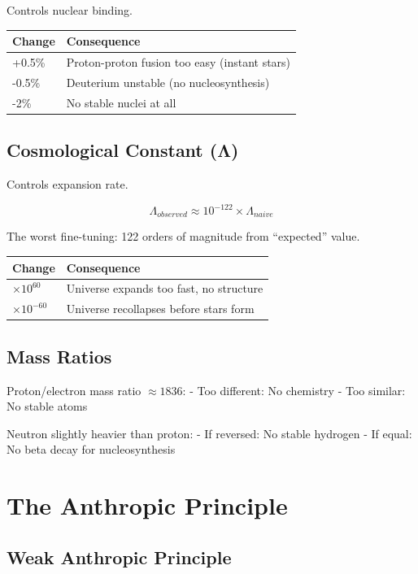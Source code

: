 \documentclass[
  11pt,
  letterpaper,
  twoside,
  openright]{book}
\begin{document}
Controls nuclear binding.

\begin{longtable}[]{@{}ll@{}}
\toprule\noalign{}
Change & Consequence \\
\midrule\noalign{}
\endhead
\bottomrule\noalign{}
\endlastfoot
+0.5\% & Proton-proton fusion too easy (instant stars) \\
-0.5\% & Deuterium unstable (no nucleosynthesis) \\
-2\% & No stable nuclei at all \\
\end{longtable}

\subsection{Cosmological Constant
(Λ)}\label{cosmological-constant-ux3bb-1}

Controls expansion rate.

\[
\Lambda_{observed} \approx 10^{-122} \times \Lambda_{naive}
\]

The worst fine-tuning: 122 orders of magnitude from ``expected'' value.

\begin{longtable}[]{@{}ll@{}}
\toprule\noalign{}
Change & Consequence \\
\midrule\noalign{}
\endhead
\bottomrule\noalign{}
\endlastfoot
\(\times 10^{60}\) & Universe expands too fast, no structure \\
\(\times 10^{-60}\) & Universe recollapses before stars form \\
\end{longtable}

\subsection{Mass Ratios}\label{mass-ratios}

Proton/electron mass ratio \(\approx 1836\): - Too different: No
chemistry - Too similar: No stable atoms

Neutron slightly heavier than proton: - If reversed: No stable hydrogen
- If equal: No beta decay for nucleosynthesis

\section{The Anthropic Principle}\label{the-anthropic-principle}

\subsection{Weak Anthropic Principle}\label{weak-anthropic-principle}
\end{document}
